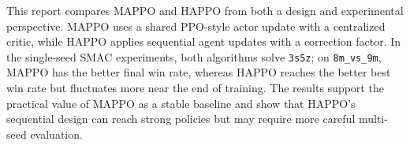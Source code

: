 \documentclass{article}
\begin{document}
This report compares MAPPO and HAPPO from both a design and experimental perspective. MAPPO uses a shared PPO-style actor update with a centralized critic, while HAPPO applies sequential agent updates with a correction factor. In the single-seed SMAC experiments, both algorithms solve \texttt{3s5z}; on \texttt{8m\_vs\_9m}, MAPPO has the better final win rate, whereas HAPPO reaches the better best win rate but fluctuates more near the end of training. The results support the practical value of MAPPO as a stable baseline and show that HAPPO's sequential design can reach strong policies but may require more careful multi-seed evaluation.



\end{document}
